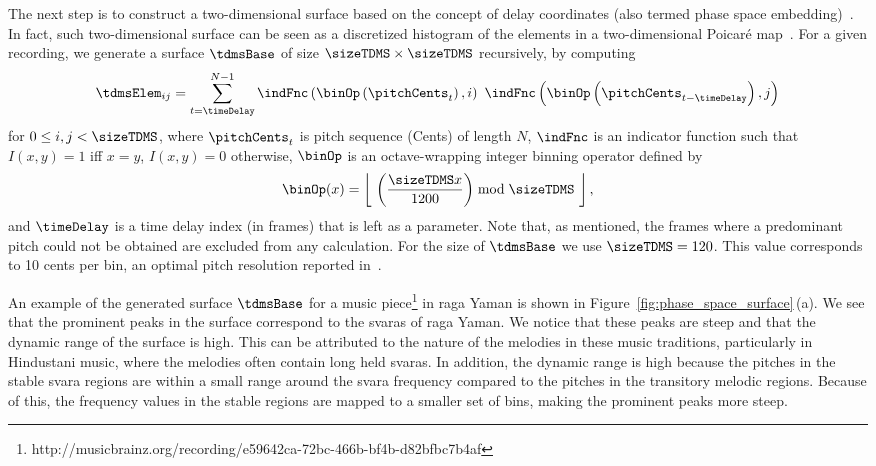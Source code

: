 The next step is to construct a two-dimensional surface based on the concept of delay coordinates (also termed phase space embedding)~\citep{takens1981detecting, Kantz04BOOK}. In fact, such two-dimensional surface can be seen as a discretized histogram of the elements in a two-dimensional Poicar\'e map~\cite{Kantz04BOOK}. For a given recording, we generate a surface $\tdmsBase$ of size $\sizeTDMS\times\sizeTDMS$ recursively, by computing
\begin{equation*}
\tdmsElem_{ij} = \sum_{t=\timeDelay}^{N-1} \indFnc\left(\binOp\left(\pitchCents_t\right),i\right)~ \indFnc\left(\binOp\left(\pitchCents_{t-\timeDelay}\right),j\right) %
\end{equation*}
for $0 \leq i,j < \sizeTDMS$, where $\pitchCents_t$ is pitch sequence (Cents) of length $N$, $\indFnc$ is an indicator function such that $I(x,y)=1$ iff $x=y$, $I(x,y)=0$ otherwise, $\binOp$ is an octave-wrapping integer binning operator defined by
\begin{equation}	
\label{eq:binning_function}	
\binOp(x) = \left\lfloor ~\left(\frac{\sizeTDMS x}{1200}\right) \bmod \sizeTDMS ~\right\rfloor,
\end{equation}
and $\timeDelay$ is a time delay index (in frames) that is left as a parameter. Note that, as mentioned, the frames where a predominant pitch could not be obtained are excluded from any calculation. For the size of $\tdmsBase$ we use $\sizeTDMS = 120$. This value  corresponds to 10 cents per bin, an optimal pitch resolution reported in~\cite{chordia2013joint}. %

An example of the generated surface $\tdmsBase$ for a music piece\footnote{http://musicbrainz.org/recording/e59642ca-72bc-466b-bf4b-d82bfbc7b4af} in \gls{raga} Yaman is shown in Figure~\ref{fig:phase_space_surface}\,(a). We see that the prominent peaks in the surface correspond to the svaras of \gls{raga} Yaman. We notice that these peaks are steep and that the dynamic range of the surface is high. This can be attributed to the nature of the melodies in these music traditions, particularly in Hindustani music, where the melodies often contain long held svaras. In addition, the dynamic range is high because the pitches in the stable svara regions are within a small range around the svara frequency compared to the pitches in the transitory melodic regions. Because of this, the frequency values in the stable regions are mapped to a smaller set of bins, making the prominent peaks more steep.

